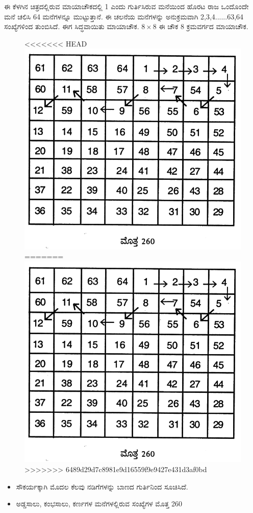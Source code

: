 ಈ ಕೆಳಗಿನ ಚಿತ್ರದಲ್ಲಿರುವ ಮಾಯಾಚೌಕದಲ್ಲಿ 1 ಎಂದು ಗುರ್ತಿಸಿರುವ ಮನೆಯಿಂದ ಹೊರಟ ರಾಜ ಒಂದೊಂದೇ ಮನೆ ಚಲಿಸಿ 64 ಮನೆಗಳನ್ನೂ ಮುಟ್ಟುತ್ತಾನೆ. ಈ ಚಲನೆಯ ಮನೆಗಳನ್ನು ಅನುಕ್ರಮವಾಗಿ 2,3,4......63,64 ಸಂಖ್ಯೆಗಳಿಂದ ತುಂಬಿಸಿದೆ. ಈಗ ಸಿದ್ಧ\-ವಾಯಿತು ಮಾಯಾಚೌಕ. $8 \times 8$ ಈ ಚೌಕ 8 ಕ್ರಮವರ್ಗದ ಮಾಯಾಚೌಕ.
\begin{figure}[H]
<<<<<<< HEAD
\includegraphics{src/figures/chap6/fig6-1.jpg}
=======
\includegraphics[scale=0.85]{src/figures/chap6/fig6.1.jpg}
>>>>>>> 6489d29d7c8981e9d16559f9e9427e431d3af0bd
\end{figure}
\begin{itemize}
	\item ಸೌಕರ್ಯಕ್ಕಾಗಿ ಮೊದಲ ಕೆಲವು ನಡಿಗೆಗಳನ್ನು ಬಾಣದ ಗುರ್ತಿನಿಂದ ಸೂಚಿಸಿದೆ.
	\item ಅಡ್ಡಸಾಲು, ಕಂಭಸಾಲು, ಕರ್ಣಗಳ ಮನೆಗಳಲ್ಲಿರುವ ಸಂಖ್ಯೆಗಳ ಮೊತ್ತ 260
\end{itemize}

